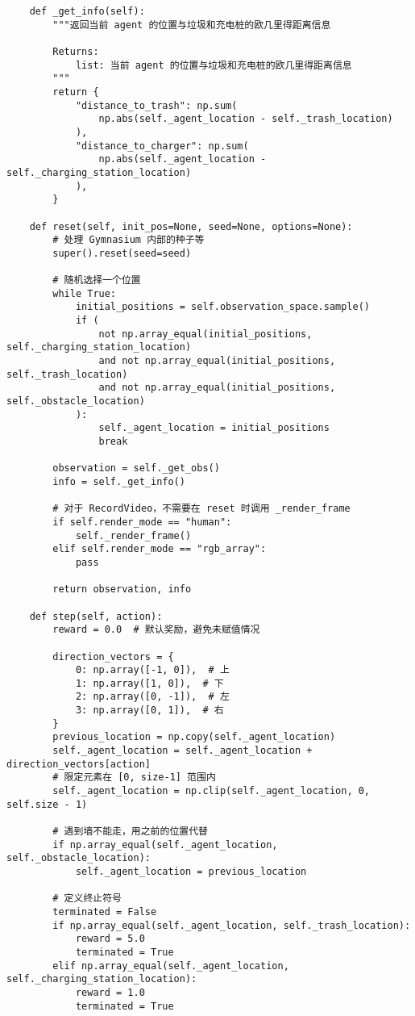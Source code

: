 \begin{verbatim}
    def _get_info(self):
        """返回当前 agent 的位置与垃圾和充电桩的欧几里得距离信息

        Returns:
            list: 当前 agent 的位置与垃圾和充电桩的欧几里得距离信息
        """
        return {
            "distance_to_trash": np.sum(
                np.abs(self._agent_location - self._trash_location)
            ),
            "distance_to_charger": np.sum(
                np.abs(self._agent_location - self._charging_station_location)
            ),
        }

    def reset(self, init_pos=None, seed=None, options=None):
        # 处理 Gymnasium 内部的种子等
        super().reset(seed=seed)

        # 随机选择一个位置
        while True:
            initial_positions = self.observation_space.sample()
            if (
                not np.array_equal(initial_positions, self._charging_station_location)
                and not np.array_equal(initial_positions, self._trash_location)
                and not np.array_equal(initial_positions, self._obstacle_location)
            ):
                self._agent_location = initial_positions
                break

        observation = self._get_obs()
        info = self._get_info()

        # 对于 RecordVideo，不需要在 reset 时调用 _render_frame
        if self.render_mode == "human":
            self._render_frame()
        elif self.render_mode == "rgb_array":
            pass

        return observation, info

    def step(self, action):
        reward = 0.0  # 默认奖励，避免未赋值情况

        direction_vectors = {
            0: np.array([-1, 0]),  # 上
            1: np.array([1, 0]),  # 下
            2: np.array([0, -1]),  # 左
            3: np.array([0, 1]),  # 右
        }
        previous_location = np.copy(self._agent_location)
        self._agent_location = self._agent_location + direction_vectors[action]
        # 限定元素在 [0, size-1] 范围内
        self._agent_location = np.clip(self._agent_location, 0, self.size - 1)

        # 遇到墙不能走，用之前的位置代替
        if np.array_equal(self._agent_location, self._obstacle_location):
            self._agent_location = previous_location

        # 定义终止符号
        terminated = False
        if np.array_equal(self._agent_location, self._trash_location):
            reward = 5.0
            terminated = True
        elif np.array_equal(self._agent_location, self._charging_station_location):
            reward = 1.0
            terminated = True


\end{verbatim}
